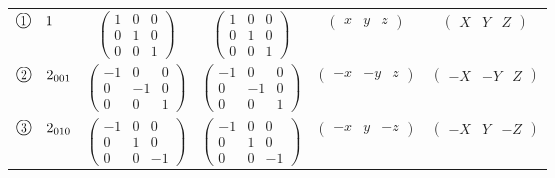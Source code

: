 \documentclass[fleqn,10pt,landscape]{jsarticle}
\begin{document}
\begin{center}
\begin{longtable}{lcccc}
$ {\ooalign{\hfil\resizebox{.8\width}{\height}{1}\hfil\crcr\raise.1ex\hbox{\large$\bigcirc$}}}\quad 1 $ & $ \begin{pmatrix} 1 & 0 & 0 \\ 0 & 1 & 0 \\ 0 & 0 & 1 \end{pmatrix} $ & $ \begin{pmatrix} 1 & 0 & 0 \\ 0 & 1 & 0 \\ 0 & 0 & 1 \end{pmatrix} $ & $ \begin{pmatrix} x & y & z \end{pmatrix} $ & $ \begin{pmatrix} X & Y & Z \end{pmatrix} $ \\
$ {\ooalign{\hfil\resizebox{.8\width}{\height}{2}\hfil\crcr\raise.1ex\hbox{\large$\bigcirc$}}}\quad 2{}_{001} $ & $ \begin{pmatrix} -1 & 0 & 0 \\ 0 & -1 & 0 \\ 0 & 0 & 1 \end{pmatrix} $ & $ \begin{pmatrix} -1 & 0 & 0 \\ 0 & -1 & 0 \\ 0 & 0 & 1 \end{pmatrix} $ & $ \begin{pmatrix} - x & - y & z \end{pmatrix} $ & $ \begin{pmatrix} - X & - Y & Z \end{pmatrix} $ \\
$ {\ooalign{\hfil\resizebox{.8\width}{\height}{3}\hfil\crcr\raise.1ex\hbox{\large$\bigcirc$}}}\quad 2{}_{010} $ & $ \begin{pmatrix} -1 & 0 & 0 \\ 0 & 1 & 0 \\ 0 & 0 & -1 \end{pmatrix} $ & $ \begin{pmatrix} -1 & 0 & 0 \\ 0 & 1 & 0 \\ 0 & 0 & -1 \end{pmatrix} $ & $ \begin{pmatrix} - x & y & - z \end{pmatrix} $ & $ \begin{pmatrix} - X & Y & - Z \end{pmatrix} $ \\

\end{longtable}
\end{center}
\end{document}
